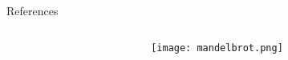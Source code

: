 \documentclass[xcolor=table]{beamer}
\begin{document}


% 
% 

\begin{frame}{References}
\nocite{*}
\begin{columns}[T] %
\begin{column}{.5\textwidth}
\footnotesize %


\end{column}
\begin{column}{.5\textwidth}
\texttt{[image: mandelbrot.png]} %
\end{column}
\end{columns}
\end{frame}
\end{document}
